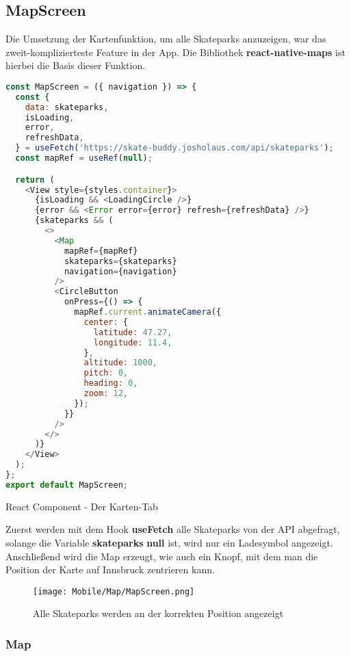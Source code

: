 \subsection{MapScreen}
Die Umsetzung der Kartenfunktion, um alle Skateparks anzuzeigen, war das zweit-komplizierteste
Feature in der App. Die Bibliothek \textbf{react-native-maps} ist hierbei die Basis dieser Funktion.

\begin{code}[htp]
\begin{lstlisting}[firstnumber=1,language=JavaScript, style=JSX]
const MapScreen = ({ navigation }) => {
  const {
    data: skateparks,
    isLoading,
    error,
    refreshData,
  } = useFetch('https://skate-buddy.josholaus.com/api/skateparks');
  const mapRef = useRef(null);

  return (
    <View style={styles.container}>
      {isLoading && <LoadingCircle />}
      {error && <Error error={error} refresh={refreshData} />}
      {skateparks && (
        <>
          <Map
            mapRef={mapRef}
            skateparks={skateparks}
            navigation={navigation}
          />
          <CircleButton
            onPress={() => {
              mapRef.current.animateCamera({
                center: {
                  latitude: 47.27,
                  longitude: 11.4,
                },
                altitude: 1000,
                pitch: 0,
                heading: 0,
                zoom: 12,
              });
            }}
          />
        </>
      )}
    </View>
  );
};
export default MapScreen;
\end{lstlisting}
\caption{React Component - Der Karten-Tab}
\end{code}

Zuerst werden mit dem Hook \textbf{useFetch} alle Skateparks von der API abgefragt, solange die Variable
\textbf{skateparks} \textbf{null} ist, wird nur ein Ladesymbol angezeigt. Anschließend wird die Map erzeugt, wie auch
ein Knopf, mit dem man die Position der Karte auf Innsbruck zentrieren kann.

\begin{figure}[H]
  \begin{center}
    \texttt{[image: Mobile/Map/MapScreen.png]}
    \caption{Alle Skateparks werden an der korrekten Position angezeigt}
  \end{center}
\end{figure}

\newpage
\subsubsection{Map}

